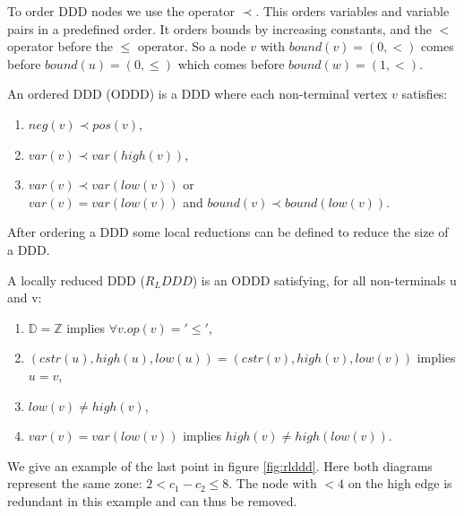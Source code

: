 To order DDD nodes we use the operator $\prec$. This orders variables and variable pairs in a predefined order. It orders bounds by increasing constants, and the $<$ operator before the $\leq$ operator. So a node $v$ with $bound(v) = (0,<)$ comes before $bound(u) = (0,\leq)$ which comes before $bound(w) = (1,<)$.

\begin{mydef}
\label{def:ODDD}
An ordered DDD (ODDD) is a DDD where each non-terminal vertex $v$ satisfies:
\begin{enumerate}
  \item $neg(v) \prec pos(v)$,
  \item $var(v) \prec var(high(v))$,
  \item $var(v) \prec var(low(v))$ or \\ $var(v) = var(low(v))$ and $bound(v) \prec bound(low(v))$.
\end{enumerate}
\end{mydef}

After ordering a DDD some local reductions can be defined to reduce the size of a DDD.

\begin{mydef}
\label{def:RLDDD}
A locally reduced DDD ($R_LDDD$) is an ODDD satisfying, for all non-terminals u and v:
\begin{enumerate}
  \item $\mathbb{D} = \mathbb{Z}$ implies $\forall v. op(v) = '\leq'$,
  \item $(cstr(u),high(u),low(u)) = (cstr(v),high(v),low(v))$ implies $u = v$,
  \item $low(v) \neq high(v)$,
  \item $var(v) = var(low(v))$ implies $high(v) \neq high(low(v))$.
\end{enumerate}
\end{mydef}

We give an example of the last point in figure \ref{fig:rlddd}. Here both diagrams represent the same zone: $2 < c_1 - c_2 \leq 8$. The node with $< 4$ on the high edge is redundant in this example and can thus be removed. 

